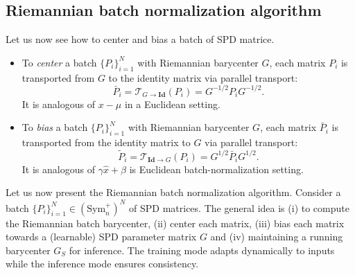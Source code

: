 \documentclass[10pt,a4paper]{book}
\theoremstyle{definition}
\theoremstyle{plain}
\theoremstyle{remark}
\newcommand{\Id}{\mathrm{\textbf{Id}}}
\begin{document}
\subsection{Riemannian batch normalization algorithm}
Let us now see how to center and bias a batch of SPD matrice.
\begin{itemize}
\item To \emph{center} a batch $\{P_i\}_{i=1}^{N}$ with Riemannian barycenter $G$, each matrix $P_i$ is transported from $G$ to the identity matrix via parallel transport:
$$\bar{P}_i=\mathcal{T}_{G\to \Id}(P_i)=G^{-1/2}P_iG^{-1/2}.$$
It is analogous of $x-\mu$ in a Euclidean setting.
\item To \emph{bias} a batch $\{P_i\}_{i=1}^{N}$ with Riemannian barycenter $G$, each matrix $\bar{P}_i$ is transported from the identity matrix to $G$ via parallel transport:
$$\tilde{P}_i=\mathcal{T}_{\Id \to G}(P_i)=G^{1/2}\bar{P}_iG^{1/2}.$$
It is analogous of $\gamma \hat{x}+\beta$ is Euclidean batch-normalization setting.
\end{itemize}
\par \medskip 
Let us now present the Riemannian batch normalization algorithm.
Consider a batch $\{P_i\}_{i=1}^{N}\in (\text{Sym}_n^{+})^{N}$ of SPD matrices.
The general idea is (i) to compute the Riemannian batch barycenter, (ii) center each matrix, (iii) bias each matrix towards a (learnable) SPD parameter matrix $G$ and (iv) maintaining a running barycenter $G_S$ for inference. The training mode adapts dynamically to inputs while the inference mode ensures consistency. 
\end{document}
